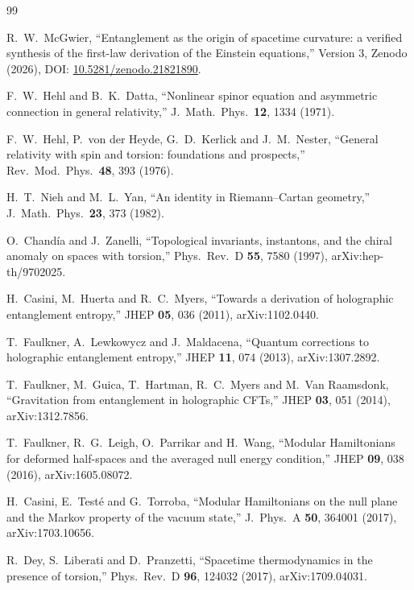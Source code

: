 \documentclass[11pt]{article}
\theoremstyle{definition}
\begin{document}
\begin{thebibliography}{99}\small

R.~W.~McGwier, ``Entanglement as the origin of spacetime curvature: a
verified synthesis of the first-law derivation of the Einstein equations,''
Version 3, Zenodo (2026), DOI:
\href{https://doi.org/10.5281/zenodo.21821890}{10.5281/zenodo.21821890}.

F.~W.~Hehl and B.~K.~Datta, ``Nonlinear spinor equation and asymmetric
connection in general relativity,''
J.\ Math.\ Phys.\ \textbf{12}, 1334 (1971).

F.~W.~Hehl, P.~von der Heyde, G.~D.~Kerlick and J.~M.~Nester, ``General
relativity with spin and torsion: foundations and prospects,''
Rev.\ Mod.\ Phys.\ \textbf{48}, 393 (1976).

H.~T.~Nieh and M.~L.~Yan, ``An identity in Riemann--Cartan geometry,''
J.\ Math.\ Phys.\ \textbf{23}, 373 (1982).

O.~Chand\'ia and J.~Zanelli, ``Topological invariants, instantons, and the
chiral anomaly on spaces with torsion,''
Phys.\ Rev.\ D \textbf{55}, 7580 (1997), arXiv:hep-th/9702025.

H.~Casini, M.~Huerta and R.~C.~Myers, ``Towards a derivation of holographic
entanglement entropy,'' JHEP \textbf{05}, 036 (2011), arXiv:1102.0440.

T.~Faulkner, A.~Lewkowycz and J.~Maldacena, ``Quantum corrections to
holographic entanglement entropy,'' JHEP \textbf{11}, 074 (2013),
arXiv:1307.2892.

T.~Faulkner, M.~Guica, T.~Hartman, R.~C.~Myers and M.~Van Raamsdonk,
``Gravitation from entanglement in holographic CFTs,''
JHEP \textbf{03}, 051 (2014), arXiv:1312.7856.

T.~Faulkner, R.~G.~Leigh, O.~Parrikar and H.~Wang, ``Modular Hamiltonians
for deformed half-spaces and the averaged null energy condition,''
JHEP \textbf{09}, 038 (2016), arXiv:1605.08072.

H.~Casini, E.~Test\'e and G.~Torroba, ``Modular Hamiltonians on the null
plane and the Markov property of the vacuum state,''
J.\ Phys.\ A \textbf{50}, 364001 (2017), arXiv:1703.10656.

R.~Dey, S.~Liberati and D.~Pranzetti, ``Spacetime thermodynamics in the
presence of torsion,'' Phys.\ Rev.\ D \textbf{96}, 124032 (2017),
arXiv:1709.04031.


\end{thebibliography}
\end{document}
